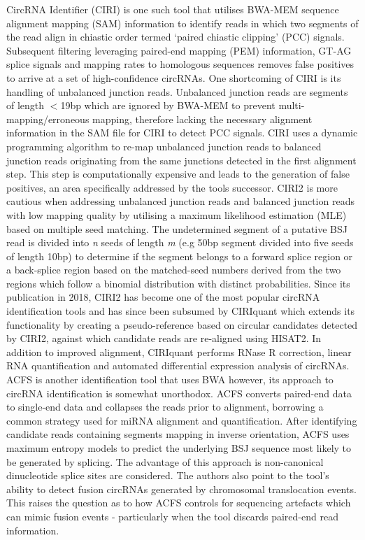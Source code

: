 \documentclass[journal,review,submit,pdftex,moreauthors]{Definitions/mdpi}
\begin{document}
CircRNA Identifier (CIRI) \cite{CIRI} is one such tool that utilises BWA-MEM sequence alignment mapping (SAM) information to identify reads in which two segments of the read align in chiastic order termed `paired chiastic clipping' (PCC) signals. Subsequent filtering leveraging paired-end mapping (PEM) information, GT-AG splice signals and mapping rates to homologous sequences removes false positives to arrive at a set of high-confidence circRNAs. One shortcoming of CIRI is its handling of unbalanced junction reads. Unbalanced junction reads are segments of length $<$19bp which are ignored by BWA-MEM to prevent multi-mapping/erroneous mapping, therefore lacking the necessary alignment information in the SAM file for CIRI to detect PCC signals. CIRI uses a dynamic programming algorithm to re-map unbalanced junction reads to balanced junction reads originating from the same junctions detected in the first alignment step. This step is computationally expensive and leads to the generation of false positives, an area specifically addressed by the tools successor. CIRI2 \cite{CIRI2} is more cautious when addressing unbalanced junction reads and balanced junction reads with low mapping quality by utilising a maximum likelihood estimation (MLE) based on multiple seed matching. The undetermined segment of a putative BSJ read is divided into \textit{n} seeds of length \textit{m} (e.g 50bp segment divided into five seeds of length 10bp) to determine if the segment belongs to a forward splice region or a back-splice region based on the matched-seed numbers derived from the two regions which follow a binomial distribution with distinct probabilities. Since its publication in 2018, CIRI2 has become one of the most popular circRNA identification tools and has since been subsumed by CIRIquant \cite{CIRIquant} which extends its functionality by creating a pseudo-reference based on circular candidates detected by CIRI2, against which candidate reads are re-aligned using HISAT2. In addition to improved alignment, CIRIquant performs RNase R correction, linear RNA quantification and automated differential expression analysis of circRNAs. ACFS \cite{ACFS} is another identification tool that uses BWA however, its approach to circRNA identification is somewhat unorthodox. ACFS converts paired-end data to single-end data and collapses the reads prior to alignment, borrowing a common strategy used for miRNA alignment and quantification. After identifying candidate reads containing segments mapping in inverse orientation, ACFS uses maximum entropy models to predict the underlying BSJ sequence most likely to be generated by splicing. The advantage of this approach is non-canonical dinucleotide splice sites are considered. The authors also point to the tool's ability to detect fusion circRNAs generated by chromosomal translocation events. This raises the question as to how ACFS controls for sequencing artefacts which can mimic fusion events - particularly when the tool discards paired-end read information. \par
\end{document}
